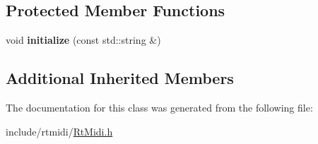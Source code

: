 \subsection*{Protected Member Functions}
\begin{DoxyCompactItemize}
\item 
void {\bfseries initialize} (const std\+::string \&)\hypertarget{class_midi_in_dummy_a20fd2cdabd0a1c841933822c795b5fba}{}\label{class_midi_in_dummy_a20fd2cdabd0a1c841933822c795b5fba}

\end{DoxyCompactItemize}
\subsection*{Additional Inherited Members}


The documentation for this class was generated from the following file\+:\begin{DoxyCompactItemize}
\item 
include/rtmidi/\hyperlink{_rt_midi_8h}{Rt\+Midi.\+h}\end{DoxyCompactItemize}
